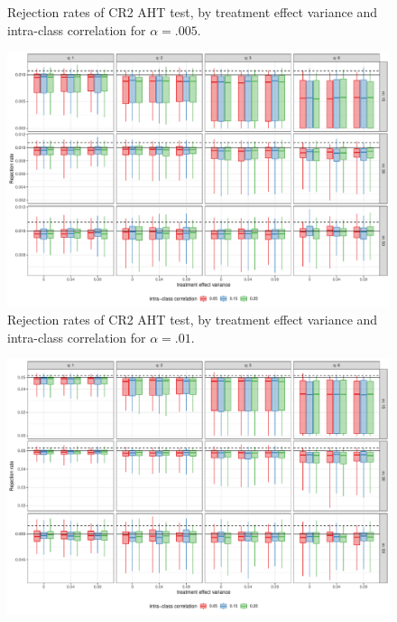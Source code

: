 \documentclass[12pt]{article}
\begin{document}
\begin{landscape}
\begin{figure}[H]
{}

\caption{Rejection rates of CR2 AHT test, by treatment effect variance and intra-class correlation for $\alpha = .005$.}\label{fig:misspecification_005}
\end{figure}

\begin{figure}[H]

{\centering \includegraphics[width=\linewidth]{CR_fig/misspecification_01-1} 

}

\caption{Rejection rates of CR2 AHT test, by treatment effect variance and intra-class correlation for $\alpha = .01$.}\label{fig:misspecification_01}
\end{figure}

\begin{figure}[H]

{\centering \includegraphics[width=\linewidth]{CR_fig/misspecification_05-1} 

}
\end{figure}
\end{landscape}
\end{document}
